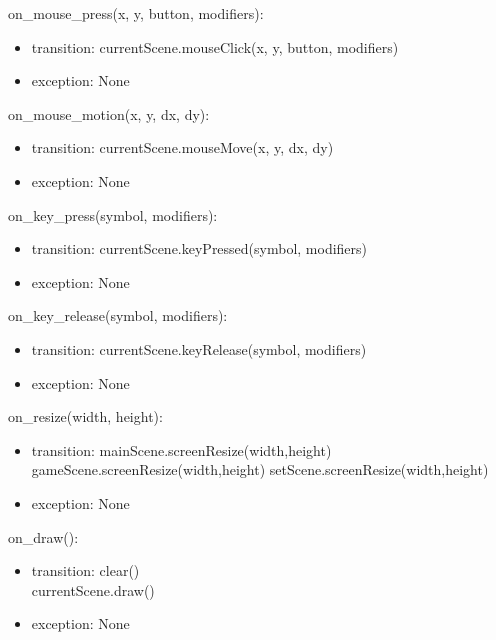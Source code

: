 \documentclass{article}
\begin{document}
\noindent on\_mouse\_press(x, y, button, modifiers):
\begin{itemize}
\item transition: currentScene.mouseClick(x, y, button, modifiers)
\item exception: None
\end{itemize}\vspace{6mm}

\noindent on\_mouse\_motion(x, y, dx, dy):
\begin{itemize}
\item transition: currentScene.mouseMove(x, y, dx, dy)
\item exception: None
\end{itemize}\vspace{6mm}

\noindent on\_key\_press(symbol, modifiers):
\begin{itemize}
\item transition: currentScene.keyPressed(symbol, modifiers)
\item exception: None
\end{itemize}\vspace{6mm}

\noindent on\_key\_release(symbol, modifiers):
\begin{itemize}
\item transition: currentScene.keyRelease(symbol, modifiers)
\item exception: None
\end{itemize}\vspace{6mm}

\noindent on\_resize(width, height):
\begin{itemize}
\item transition: mainScene.screenResize(width,height)\\
    gameScene.screenResize(width,height)
    setScene.screenResize(width,height)
\item exception: None
\end{itemize}\vspace{6mm}

\noindent on\_draw():
\begin{itemize}
\item transition: clear()\\
    currentScene.draw()
\item exception: None
\end{itemize}\vspace{6mm}

\newpage
\end{document}
